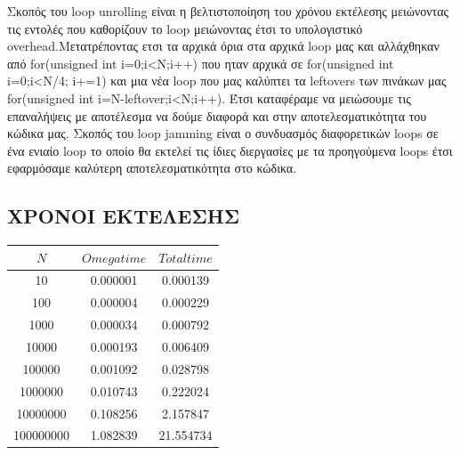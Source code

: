 \documentclass{FR16}
\begin{document}
Σκοπός του loop unrolling είναι η βελτιστοποίηση του χρόνου εκτέλεσης μειώνοντας τις εντολές που καθορίζουν το loop μειώνοντας έτσι το υπολογιστικό overhead.Μετατρέποντας ετσι τα αρχικά όρια στα αρχικά loop μας και αλλάχθηκαν από for(unsigned int i=0;i<N;i++) που ηταν αρχικά σε for(unsigned int i=0;i<N/4; i+=1) και μια νέα loop που μας καλύπτει τα leftovers των πινάκων μας for(unsigned int i=N-leftover;i<N;i++). Έτσι καταφέραμε να μειώσουμε τις επαναλήψεις με αποτέλεσμα να δούμε διαφορά και στην αποτελεσματικότητα του κώδικα μας.\newline
Σκοπός του loop jamming είναι ο συνδυασμός διαφορετικών loops σε ένα ενιαίο loop το οποίο θα εκτελεί τις ίδιες διεργασίες με τα προηγούμενα loops έτσι εφαρμόσαμε καλύτερη αποτελεσματικότητα στο κώδικα.

\subsection{ΧΡΟΝΟΙ ΕΚΤΕΛΕΣΗΣ}
\begin{center}
\begin{tabular}{c c c}
\arrayrulecolor{Azzurro}
\hline
{\bfseries $Ν$} & {\bfseries $Omega time$} & {\bfseries $Total time$}\\
\hline
10    & 0.000001 & 0.000139 \\
100   & 0.000004 & 0.000229 \\
1000  & 0.000034 & 0.000792 \\
10000 & 0.000193 & 0.006409 \\
100000 & 0.001092 & 0.028798 \\
1000000 & 0.010743 & 0.222024 \\
10000000 & 0.108256 & 2.157847 \\
100000000 & 1.082839 & 21.554734 \\
\hline
\end{tabular}
\end{center}
\end{document}
